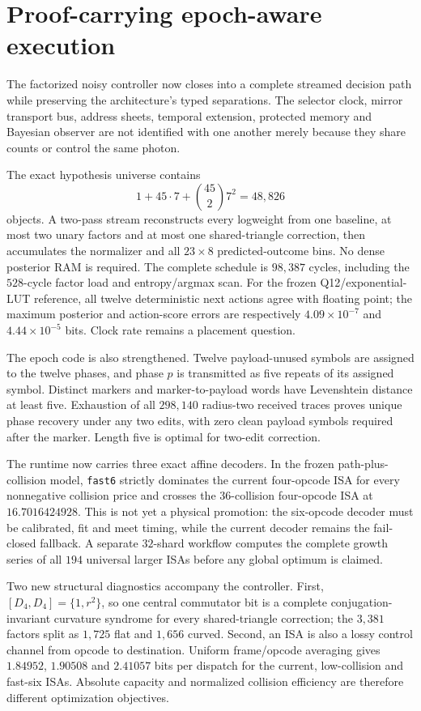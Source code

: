 \section{Proof-carrying epoch-aware execution}
\label{sec:bt3163-bt3174}

The factorized noisy controller now closes into a complete streamed decision path while
preserving the architecture's typed separations.  The selector clock, mirror transport bus,
address sheets, temporal extension, protected memory and Bayesian observer are not identified
with one another merely because they share counts or control the same photon.

The exact hypothesis universe contains
\[
1+45\cdot7+\binom{45}{2}7^2=48{,}826
\]
objects.  A two-pass stream reconstructs every logweight from one baseline, at most two unary
factors and at most one shared-triangle correction, then accumulates the normalizer and all
$23\times8$ predicted-outcome bins.  No dense posterior RAM is required.  The complete
schedule is $98{,}387$ cycles, including the $528$-cycle factor load and entropy/argmax scan.
For the frozen Q12/exponential-LUT reference, all twelve deterministic next actions agree
with floating point; the maximum posterior and action-score errors are respectively
$4.09\times10^{-7}$ and $4.44\times10^{-5}$ bits.  Clock rate remains a placement question.

The epoch code is also strengthened.  Twelve payload-unused symbols are assigned to the twelve
phases, and phase $p$ is transmitted as five repeats of its assigned symbol.  Distinct markers
and marker-to-payload words have Levenshtein distance at least five.  Exhaustion of all
$298{,}140$ radius-two received traces proves unique phase recovery under any two edits, with
zero clean payload symbols required after the marker.  Length five is optimal for two-edit
correction.

The runtime now carries three exact affine decoders.  In the frozen path-plus-collision model,
\texttt{fast6} strictly dominates the current four-opcode ISA for every nonnegative collision
price and crosses the $36$-collision four-opcode ISA at $16.7016424928$.  This is not yet a
physical promotion: the six-opcode decoder must be calibrated, fit and meet timing, while the
current decoder remains the fail-closed fallback.  A separate $32$-shard workflow computes the
complete growth series of all $194$ universal larger ISAs before any global optimum is claimed.

Two new structural diagnostics accompany the controller.  First,
$[D_4,D_4]=\{1,r^2\}$, so one central commutator bit is a complete conjugation-invariant
curvature syndrome for every shared-triangle correction; the $3{,}381$ factors split as
$1{,}725$ flat and $1{,}656$ curved.  Second, an ISA is also a lossy control channel from
opcode to destination.  Uniform frame/opcode averaging gives $1.84952$, $1.90508$ and
$2.41057$ bits per dispatch for the current, low-collision and fast-six ISAs.  Absolute
capacity and normalized collision efficiency are therefore different optimization objectives.

